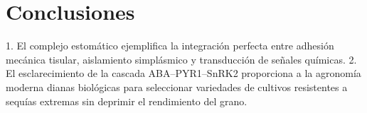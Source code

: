 \documentclass[12pt,spanish,letterpaper,oneside]{article}
\begin{document}
\section{Conclusiones}
1. El complejo estomático ejemplifica la integración perfecta entre adhesión mecánica tisular, aislamiento simplásmico y transducción de señales químicas.
2. El esclarecimiento de la cascada ABA--PYR1--SnRK2 proporciona a la agronomía moderna dianas biológicas para seleccionar variedades de cultivos resistentes a sequías extremas sin deprimir el rendimiento del grano.

\newpage
\printbibliography[title={Referencias bibliográficas}]
\end{document}
